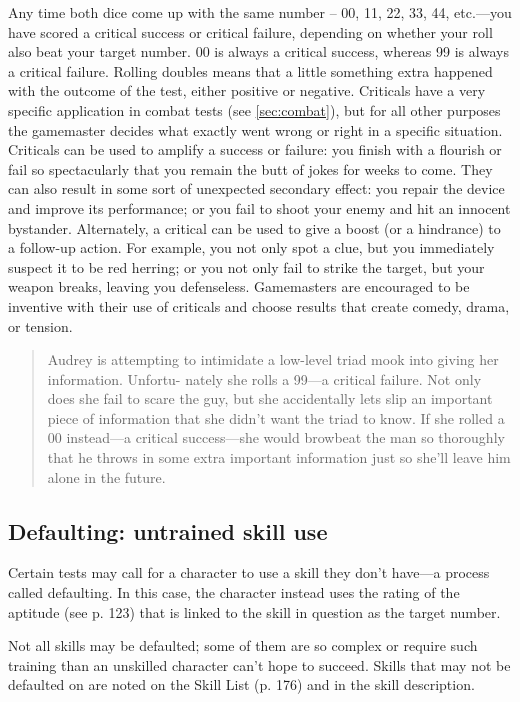 Any time both dice come up with the same number -- 00, 11, 22, 33, 44,
etc.—you have scored a critical success or critical failure, depending
on whether your roll also beat your target number. 00 is always a
critical success, whereas 99 is always a critical failure.  Rolling
doubles means that a little something extra happened with the outcome
of the test, either positive or negative. Criticals have a very
specific application in combat tests (see \ref{sec:combat}), but for
all other purposes the gamemaster decides what exactly went wrong or
right in a specific situation. Criticals can be used to amplify a
success or failure: you finish with a flourish or fail so
spectacularly that you remain the butt of jokes for weeks to
come. They can also result in some sort of unexpected secondary
effect: you repair the device and improve its performance; or you fail
to shoot your enemy and hit an innocent bystander.  Alternately, a
critical can be used to give a boost (or a hindrance) to a follow-up
action. For example, you not only spot a clue, but you immediately
suspect it to be red herring; or you not only fail to strike the
target, but your weapon breaks, leaving you defenseless. Gamemasters
are encouraged to be inventive with their use of criticals and choose
results that create comedy, drama, or tension.

\begin{quotation}
  Audrey is attempting to intimidate a low-level triad mook into
  giving her information. Unfortu- nately she rolls a 99—a critical
  failure. Not only does she fail to scare the guy, but she
  accidentally lets slip an important piece of information that she
  didn't want the triad to know. If she rolled a 00 instead—a critical
  success—she would browbeat the man so thoroughly that he throws in
  some extra important information just so she'll leave him alone in
  the future.
\end{quotation}

\subsection{Defaulting: untrained skill use}
\label{sec:defa-untr-skill}

Certain tests may call for a character to use a skill they don't
have—a process called defaulting. In this case, the character instead
uses the rating of the aptitude (see p. 123) that is linked to the
skill in question as the target number.

Not all skills may be defaulted; some of them are so complex or
require such training than an unskilled character can't hope to
succeed. Skills that may not be defaulted on are noted on the Skill
List (p. 176) and in the skill description.

